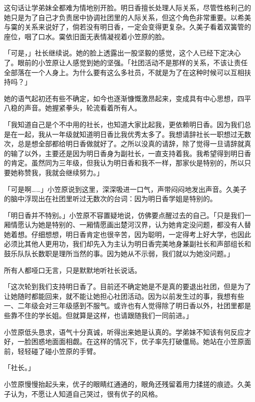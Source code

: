 \documentclass[UTF8]{ctexart}
\begin{document}
    这句话让学弟妹全都难为情地别开脸。明日香擅长处理人际关系，尽管性格利己的她只是为了自己才负责居中协调社团里的人际关系，但这个角色非常重要。以希美与霙的关系来说好了，倘若没有明日香，一定会变得更复杂。久美子看着双簧管的座位，咽了口水。霙依旧面无表情凝视着小笠原的脸。 

    「可是，」社长继续说。她的脸上透露出一股坚毅的感觉，这个人已经下定决心了。眼前的小笠原让人感觉到她的坚强。「社团活动不是那样的关系，不该让责任全部落在一个人身上。为什么要有这么多社员，不就是为了在这种时候可以互相扶持吗？」 

    她的语气起初还有些不确定，如今也逐渐慷慨激昂起来，变成具有中心思想，四平八稳的声音。她握紧拳头，轮流看着所有人。 

    「我知道自己是个不中用的社长，也知道大家比起我，更依赖明日香。因为我们总是在一起，我从一年级就知道明日香比我优秀太多了。我想请辞社长一职想过无数次，总是想全部都给明日香做就好了。之所以没真的请辞，除了觉得一旦请辞就真的输了以外，主要还是因为明日香身为副社长，一直支持着我。我希望得到明日香的肯定。虽然同为三年级，但我认为明日香和我不一样，那家伙是特别的，所以只要她称赞我，我就会继续努力。」 

    「可是啊……」小笠原说到这里，深深吸进一口气，声带闷闷地发出声音。久美子的脑中浮现出在社团里听过无数次的台词：因为明日香学姐是特别的。 

    「明日香并不特别。」小笠原不容置疑地说，仿佛要点醒过去的自己。「只是我们一厢情愿认为她是特别的、一厢情愿画出楚河汉界，认为她肯定没问题，都没有人替她着想。仔细想想，明日香肯定也很辛苦，因为聪明，一定得考上好大学，也因此必须比其他人更用功，我们却先入为主认为明日香完美地身兼副社长和声部组长和鼓乐队队长数职是理所当然的事。因为她从不示弱，我们就以为她没问题。」 

    所有人都哑口无言，只是默默地听社长说话。 

    「这次轮到我们支持明日香了。目前还不确定她是不是真的要退出社团，但是为了让她随时都能回来，就不能让她担心社团活动。因为以前发生过的事，我想有些一、二年级会对三年级感到不服气。或许也有人觉得除了明日香以外，社团里都是些靠不住的学长姐。但就算是这样，也请跟随我们一同前进。」 

    小笠原低头恳求，语气十分真诚，听得出来她是认真的。学弟妹不知该有何反应才好，一脸困惑地面面相觑。在这样的情况下，优子率先打破僵局。她站在小笠原面前，轻轻碰了碰小笠原的手臂。 

    「社长。」 

    小笠原慢慢抬起头来，优子的眼睛红通通的，眼角还残留着用力揉搓的痕迹。久美子认为，不愿让人知道自己哭过，很有优子的风格。 
\end{document}
